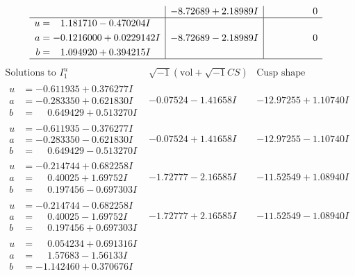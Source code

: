 \documentclass[1p]{elsarticle_modified}
\theoremstyle{definition}
\newcommand{\I}{\sqrt{-1}}
\begin{document}
$$\begin{array}{c|c|c}
 & -8.72689 + 2.18989 I & \phantom{-0.000000 } 0 \\ \hline\begin{aligned}
u &= \phantom{-}1.181710 - 0.470204 I \\
a &= -0.1216000 + 0.0229142 I \\
b &= \phantom{-}1.094920 + 0.394215 I\end{aligned}
 & -8.72689 - 2.18989 I & \phantom{-0.000000 } 0\\
 \hline 
 \end{array}$$\newpage$$\begin{array}{c|c|c}  
\text{Solutions to }I^u_{1}& \I (\text{vol} + \sqrt{-1}CS) & \text{Cusp shape}\\
 \hline 
\begin{aligned}
u &= -0.611935 + 0.376277 I \\
a &= -0.283350 + 0.621830 I \\
b &= \phantom{-}0.649429 + 0.513270 I\end{aligned}
 & -0.07524 - 1.41658 I & -12.97255 + 1.10740 I \\ \hline\begin{aligned}
u &= -0.611935 - 0.376277 I \\
a &= -0.283350 - 0.621830 I \\
b &= \phantom{-}0.649429 - 0.513270 I\end{aligned}
 & -0.07524 + 1.41658 I & -12.97255 - 1.10740 I \\ \hline\begin{aligned}
u &= -0.214744 + 0.682258 I \\
a &= \phantom{-}0.40025 + 1.69752 I \\
b &= \phantom{-}0.197456 - 0.697303 I\end{aligned}
 & -1.72777 - 2.16585 I & -11.52549 + 1.08940 I \\ \hline\begin{aligned}
u &= -0.214744 - 0.682258 I \\
a &= \phantom{-}0.40025 - 1.69752 I \\
b &= \phantom{-}0.197456 + 0.697303 I\end{aligned}
 & -1.72777 + 2.16585 I & -11.52549 - 1.08940 I \\ \hline\begin{aligned}
u &= \phantom{-}0.054234 + 0.691316 I \\
a &= \phantom{-}1.57683 - 1.56133 I \\
b &= -1.142460 + 0.370676 I\end{aligned}

\end{array}$$
\end{document}
